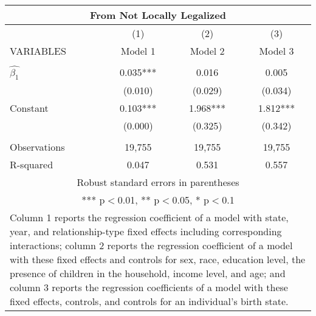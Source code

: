 \begin{tabular}{lccc}
\multicolumn{4}{c}{From Not Locally Legalized} \\ \hline
 & (1) & (2) & (3) \\
VARIABLES & Model 1 & Model 2 & Model 3 \\ \hline
 &  &  &  \\
$\hat{\beta_1}$ & 0.035*** & 0.016 & 0.005 \\
 & (0.010) & (0.029) & (0.034) \\
Constant & 0.103*** & 1.968*** & 1.812*** \\
 & (0.000) & (0.325) & (0.342) \\
 &  &  &  \\
Observations & 19,755 & 19,755 & 19,755 \\
 R-squared & 0.047 & 0.531 & 0.557 \\ \hline
\multicolumn{4}{c}{ Robust standard errors in parentheses} \\
\multicolumn{4}{c}{ *** p$<$0.01, ** p$<$0.05, * p$<$0.1} \\
\multicolumn{4}{p{0.8\linewidth}}{\small Column 1 reports the regression coefficient of a model with state, year, and relationship-type fixed effects including corresponding interactions; column 2 reports the regression coefficient of a model with these fixed effects and controls for sex, race, education level, the presence of children in the household, income level, and age; and column 3 reports the regression coefficients of a model with these fixed effects, controls, and controls for an individual’s birth state.} \\
\end{tabular}
